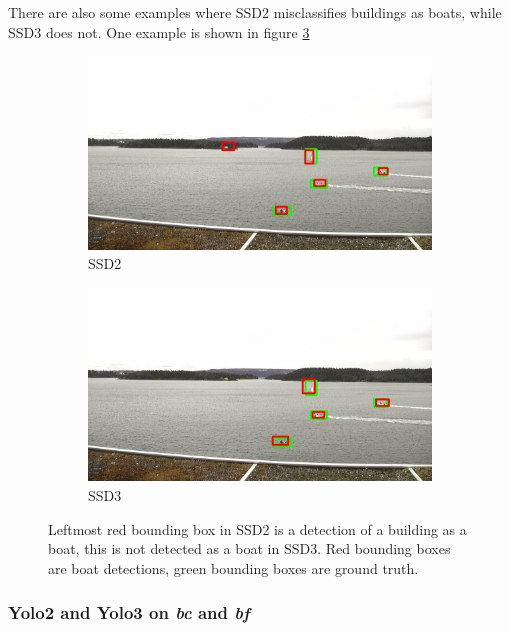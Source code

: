 There are also some examples where SSD2 misclassifies buildings as boats, while SSD3 does not. One example is shown in figure \ref{img:misclass_ssd}

\begin{figure}[h!]
\begin{subfigure}{.5\textwidth}
  \centering
  \includegraphics[width=0.9\linewidth]{results/case_buildings/misclass/selected_08_07_frame11982_bbnb.jpg}
  \caption{SSD2}
  \label{fig:misclass_ssd2}
\end{subfigure}%
\begin{subfigure}{.5\textwidth}
  \centering
  \includegraphics[width=.9\linewidth]{results/case_buildings/misclass/selected_08_07_frame11982_build.jpg}
  \caption{SSD3}
  \label{fig:misclass_ssd3}
\end{subfigure}
\caption{Leftmost red bounding box in SSD2 is a detection of a building as a boat, this is not detected as a boat in SSD3. Red bounding boxes are boat detections, green bounding boxes are ground truth.}
\label{img:misclass_ssd}
\end{figure}

\vspace{3mm}
\newpage

\subsubsection{Yolo2 and Yolo3 on \textit{bc} and \textit{bf}}

